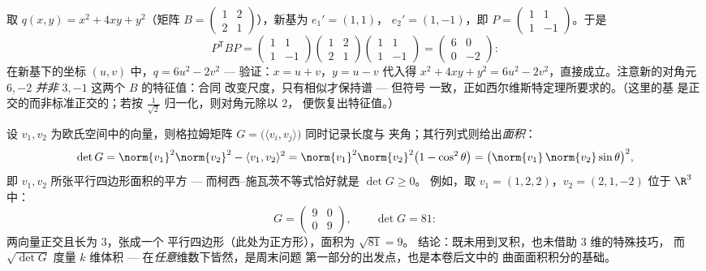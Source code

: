 \begin{example}[合同的作用]\label{ex:b2:quadratic:congruence}
取 $q(x, y) = x^2 + 4xy + y^2$（矩阵 $B = \begin{pmatrix} 1
& 2\\ 2 & 1\end{pmatrix}$），新基为 $e_1' = (1, 1)$，
$e_2' = (1, -1)$，即 $P = \begin{pmatrix} 1 & 1\\ 1 &
-1\end{pmatrix}$。于是
\[
P^{\mathsf T}BP
= \begin{pmatrix} 1 & 1\\ 1 & -1\end{pmatrix}
\begin{pmatrix} 1 & 2\\ 2 & 1\end{pmatrix}
\begin{pmatrix} 1 & 1\\ 1 & -1\end{pmatrix}
= \begin{pmatrix} 6 & 0\\ 0 & -2\end{pmatrix} :
\]
在新基下的坐标 $(u, v)$ 中，$q = 6u^2 -
2v^2$ --- 验证：$x = u + v$，$y = u - v$ 代入得 $x^2 + 4xy +
y^2 = 6u^2 - 2v^2$，直接成立。注意新的对角元 $6,
-2$ \emph{并非} $3, -1$ 这两个 $B$ 的特征值：合同
改变尺度，只有相似才保持谱 --- 但符号
一致，正如西尔维斯特定理所要求的。（这里的基
是正交的而非标准正交的；若按
$\frac{1}{\sqrt2}$ 归一化，则对角元除以 $2$，
便恢复出特征值。）
\end{example}

\begin{example}[格拉姆行列式度量面积]\label{ex:b2:quadratic:gramarea}
设 $v_1, v_2$ 为欧氏空间中的向量，则格拉姆矩阵 $G =
\bigl(\langle v_i, v_j\rangle\bigr)$ 同时记录长度与
夹角；其行列式则给出\emph{面积}：
\[
\det G = \norm{v_1}^2\norm{v_2}^2 - \langle v_1, v_2\rangle^2
= \norm{v_1}^2\norm{v_2}^2\bigl(1 - \cos^2\theta\bigr)
= \bigl(\norm{v_1}\,\norm{v_2}\sin\theta\bigr)^2 ,
\]
即 $v_1, v_2$ 所张平行四边形面积的平方 ---
而柯西–施瓦茨不等式恰好就是 $\det G \geq 0$。
例如，取 $v_1 = (1, 2, 2)$，$v_2 = (2, 1, -2)$ 位于
$\R^3$ 中：
\[
G = \begin{pmatrix} 9 & 0\\ 0 & 9 \end{pmatrix},
\qquad
\det G = 81 :
\]
两向量正交且长为 $3$，张成一个
平行四边形（此处为正方形），面积为 $\sqrt{81} = 9$。
结论：既未用到叉积，也未借助 $3$ 维的特殊技巧，
而 $\sqrt{\det G}$ 度量 $k$ 维体积 ---
在\emph{任意}维数下皆然，是周末问题
第一部分的出发点，也是本卷后文中的
曲面面积积分的基础。
\end{example}

